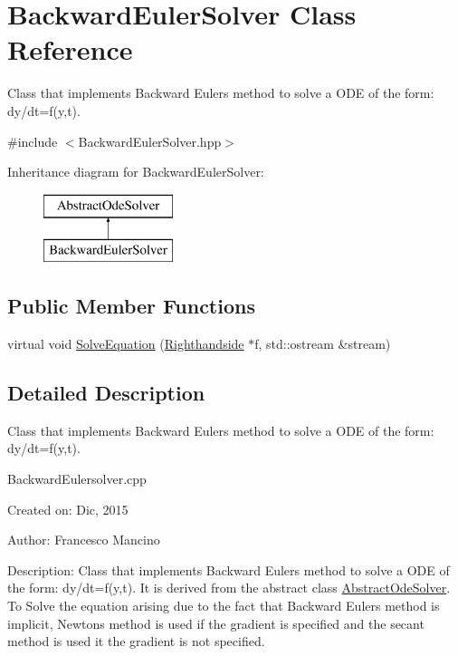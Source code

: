 \hypertarget{class_backward_euler_solver}{}\section{Backward\+Euler\+Solver Class Reference}
\label{class_backward_euler_solver}


Class that implements Backward Eulers method to solve a O\+D\+E of the form\+: dy/dt=f(y,t).  




{\ttfamily \#include $<$Backward\+Euler\+Solver.\+hpp$>$}

Inheritance diagram for Backward\+Euler\+Solver\+:\begin{figure}[H]
\begin{center}
\leavevmode
\includegraphics[height=2.000000cm]{class_backward_euler_solver}
\end{center}
\end{figure}
\subsection*{Public Member Functions}
\begin{DoxyCompactItemize}
\item 
virtual void \hyperlink{class_backward_euler_solver_ad800861c582a920b98288d65e0f68d45}{Solve\+Equation} (\hyperlink{class_righthandside}{Righthandside} $\ast$f, std\+::ostream \&stream)
\end{DoxyCompactItemize}


\subsection{Detailed Description}
Class that implements Backward Eulers method to solve a O\+D\+E of the form\+: dy/dt=f(y,t). 

Backward\+Eulersolver.\+cpp

Created on\+: Dic, 2015 \begin{DoxyVerb}Author: Francesco Mancino
\end{DoxyVerb}


Description\+: Class that implements Backward Eulers method to solve a O\+D\+E of the form\+: dy/dt=f(y,t). It is derived from the abstract class \hyperlink{class_abstract_ode_solver}{Abstract\+Ode\+Solver}. To Solve the equation arising due to the fact that Backward Eulers method is implicit, Newtons method is used if the gradient is specified and the secant method is used it the gradient is not specified. 

